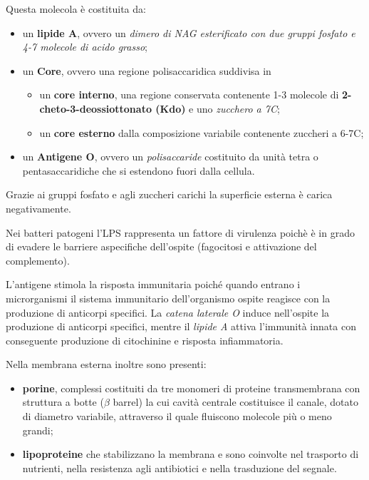 \documentclass[11pt]{book}
\begin{document}
Questa molecola è costituita da:
\begin{itemize}
\item un \textbf{lipide A}, ovvero un \emph{dimero di NAG esterificato con due gruppi fosfato e 4-7 molecole di acido grasso};
\item un \textbf{Core}, ovvero una regione polisaccaridica suddivisa in 
\begin{itemize}
\item un \textbf{core interno}, una regione conservata contenente 1-3 molecole di \textbf{2-cheto-3-deossiottonato (Kdo)} e uno \emph{zucchero a 7C};
\item un \textbf{core esterno} dalla composizione variabile contenente zuccheri a 6-7C; 
\end{itemize}
\item un \textbf{Antigene O}, ovvero un \emph{polisaccaride} costituito da unità tetra o pentasaccaridiche che si estendono fuori dalla cellula.
\end{itemize}

Grazie ai gruppi fosfato e agli zuccheri carichi la superficie esterna è carica negativamente.

\vspace{1em}
Nei batteri patogeni l’LPS rappresenta un fattore di virulenza poichè è in grado di evadere le barriere aspecifiche dell’ospite (fagocitosi e attivazione del complemento).

L'antigene stimola la risposta immunitaria poiché quando entrano i microrganismi il sistema immunitario dell'organismo ospite reagisce con la produzione di anticorpi specifici.
La \emph{catena laterale O} induce nell’ospite la produzione di anticorpi specifici, mentre il \emph{lipide A} attiva l’immunità innata con conseguente produzione di citochinine e risposta infiammatoria.

\clearpage
Nella membrana esterna inoltre sono presenti:
\begin{itemize}
\item \textbf{porine}, complessi costituiti da tre monomeri di proteine transmembrana con struttura a botte ($\beta$ barrel) la cui cavità centrale costituisce il canale, dotato di diametro variabile, attraverso il quale fluiscono molecole più o meno grandi;
\item \textbf{lipoproteine} che stabilizzano la membrana e sono coinvolte nel trasporto di nutrienti, nella resistenza agli antibiotici e nella trasduzione del segnale.
\end{itemize}
\end{document}
